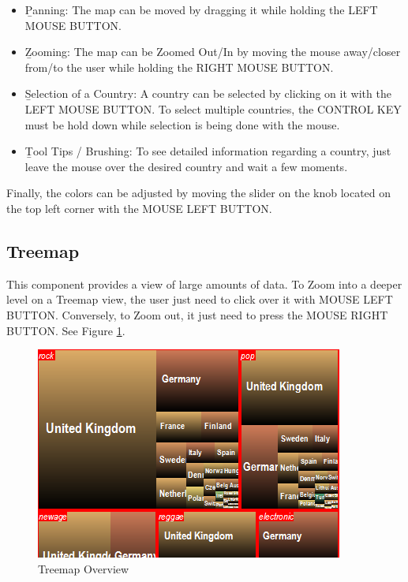 \documentclass[twocolumn,8pt]{article}
\begin{document}
\begin{itemize}
\item {\b Panning}: The map can be moved by dragging it while holding the LEFT MOUSE BUTTON.\\

\item {\b Zooming}: The map can be Zoomed Out/In by moving the mouse away/closer from/to the user while holding the RIGHT MOUSE BUTTON.\\

\item {\b Selection of a Country}: A country can be selected by clicking on it with the LEFT MOUSE BUTTON. To select multiple countries, the CONTROL KEY must be hold down while selection is being done with the mouse.\\

\item {\b Tool Tips / Brushing}: To see detailed information regarding a country, just leave the mouse over the desired country and wait a few moments.

\end{itemize}

Finally, the colors can be adjusted by moving the slider on the knob located on the top left corner with the MOUSE LEFT BUTTON.

\subsection{Treemap}

This component provides a view of large amounts of data. To Zoom into a deeper level on a Treemap view, the user just need to click over it with MOUSE LEFT BUTTON. Conversely, to Zoom out, it just need to press the MOUSE RIGHT BUTTON. See Figure
\ref{fig:treemap}.

\begin{figure}[hbtp]
  \begin{center}
	\includegraphics[scale=0.5]{./pics/treemap.png}
    \caption{Treemap Overview}
    \label{fig:treemap}
  \end{center}
\end{figure}
\end{document}
